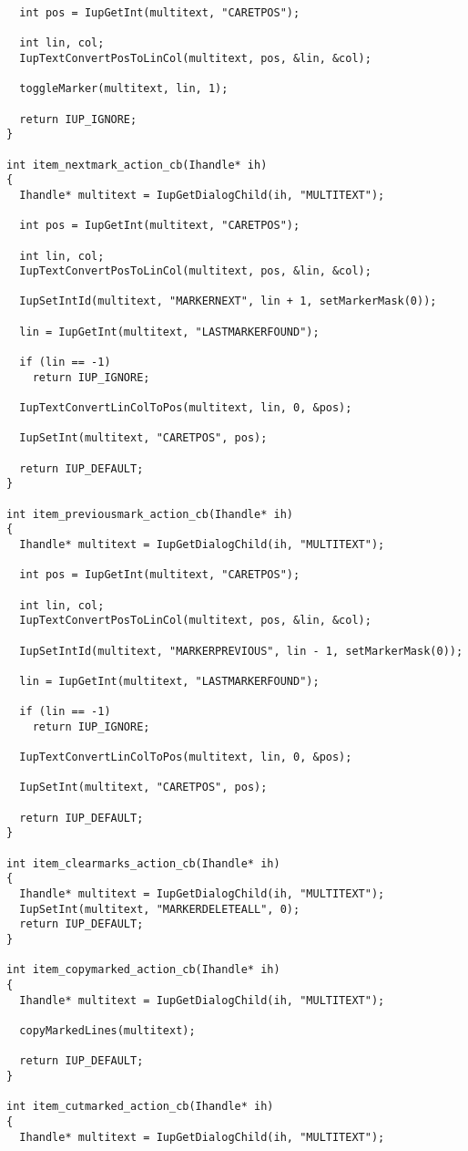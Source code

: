 \documentclass{ctexart}
\begin{document}
\begin{lstlisting}
  int pos = IupGetInt(multitext, "CARETPOS");

  int lin, col;
  IupTextConvertPosToLinCol(multitext, pos, &lin, &col);

  toggleMarker(multitext, lin, 1);

  return IUP_IGNORE;
}

int item_nextmark_action_cb(Ihandle* ih)
{
  Ihandle* multitext = IupGetDialogChild(ih, "MULTITEXT");

  int pos = IupGetInt(multitext, "CARETPOS");

  int lin, col;
  IupTextConvertPosToLinCol(multitext, pos, &lin, &col);

  IupSetIntId(multitext, "MARKERNEXT", lin + 1, setMarkerMask(0));

  lin = IupGetInt(multitext, "LASTMARKERFOUND");

  if (lin == -1)
    return IUP_IGNORE;

  IupTextConvertLinColToPos(multitext, lin, 0, &pos);

  IupSetInt(multitext, "CARETPOS", pos);

  return IUP_DEFAULT;
}

int item_previousmark_action_cb(Ihandle* ih)
{
  Ihandle* multitext = IupGetDialogChild(ih, "MULTITEXT");

  int pos = IupGetInt(multitext, "CARETPOS");

  int lin, col;
  IupTextConvertPosToLinCol(multitext, pos, &lin, &col);

  IupSetIntId(multitext, "MARKERPREVIOUS", lin - 1, setMarkerMask(0));

  lin = IupGetInt(multitext, "LASTMARKERFOUND");

  if (lin == -1)
    return IUP_IGNORE;

  IupTextConvertLinColToPos(multitext, lin, 0, &pos);

  IupSetInt(multitext, "CARETPOS", pos);

  return IUP_DEFAULT;
}

int item_clearmarks_action_cb(Ihandle* ih)
{
  Ihandle* multitext = IupGetDialogChild(ih, "MULTITEXT");
  IupSetInt(multitext, "MARKERDELETEALL", 0);
  return IUP_DEFAULT;
}

int item_copymarked_action_cb(Ihandle* ih)
{
  Ihandle* multitext = IupGetDialogChild(ih, "MULTITEXT");

  copyMarkedLines(multitext);

  return IUP_DEFAULT;
}

int item_cutmarked_action_cb(Ihandle* ih)
{
  Ihandle* multitext = IupGetDialogChild(ih, "MULTITEXT");


\end{lstlisting}
\end{document}
